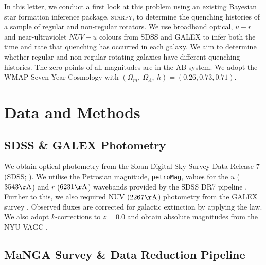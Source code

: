 \documentclass[useAMS,usenatbib]{mn2e}
\begin{document}
In this letter, we conduct a first look at this problem using an existing Bayesian star formation inference package, \textsc{starpy}, to determine the quenching histories of a sample of regular and non-regular rotators. We use broadband optical, $u-r$ and near-ultraviolet $NUV-u$ colours from SDSS and GALEX to infer both the time and rate that quenching has occurred in each galaxy. We aim to determine whether regular and non-regular rotating galaxies have different quenching histories. 
The zero points of all magnitudes are in the AB system. We adopt the WMAP Seven-Year Cosmology \citep{jarosik11} with $(\Omega_m , ~\Omega_\Lambda , ~h) = (0.26, 0.73, 0.71)$.



\section{Data and Methods}\label{sec:datamethods}

\subsection{SDSS \& GALEX Photometry}\label{sec:photom}

We obtain optical photometry from the Sloan Digital Sky Survey Data Release 7 (SDSS; \citealt{york00, abazajian09}). We utilise the Petrosian magnitude, {\tt petroMag}, values for the $u$ ($3543 \rm{\AA}$) and $r$ ($6231 \rm{\AA}$) wavebands provided by the SDSS DR7 pipeline \citep{stoughton02}. Further to this, we also required NUV ($2267 \rm{\AA}$) photometry from the GALEX survey \citep{martin05}. Observed fluxes are corrected for galactic extinction \citep{Oh11} by applying the \citet*{Cardelli89} law. We also adopt $k$-corrections to $z = 0.0$ and obtain absolute magnitudes from the NYU-VAGC \citep{blanton05, padmanabhan08, blanton07}.

\subsection{MaNGA Survey \& Data Reduction Pipeline}\label{sec:manga}
\end{document}
